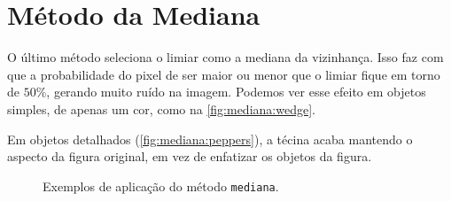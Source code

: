\section{Método da Mediana}

O último método seleciona o limiar como a mediana da vizinhança. Isso faz com que a probabilidade do pixel de ser maior ou menor que o limiar fique em torno de $50\%$, gerando muito ruído na imagem. Podemos ver esse efeito em objetos simples, de apenas um cor, como na \cref{fig:mediana:wedge}.

Em objetos detalhados (\cref{fig:mediana:peppers}), a técina acaba mantendo o aspecto da figura original, em vez de enfatizar os objetos da figura.

\begin{figure}[H]
    \centering

    \caption{Exemplos de aplicação do método \texttt{mediana}.}
    \label{fig:mediana}
\end{figure}

